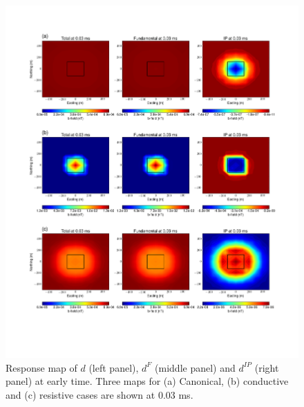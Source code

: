 \documentclass[a4paper, 11pt]{article}
\newcommand{\dip}{d^{IP}}
\begin{document}
\begin{figure}[htb]
  \centering  \includegraphics[width=1.0\textwidth]{figures/threecasesresp/IPresp_ch6.png}
  \caption{Response map of $d$ (left panel), $d^{F}$ (middle panel) and $\dip$ (right panel) at early time. Three maps for  (a) Canonical, (b) conductive and (c) resistive cases are shown at 0.03 ms.}
  \label{F:IPresp1}
\end{figure}
\end{document}
